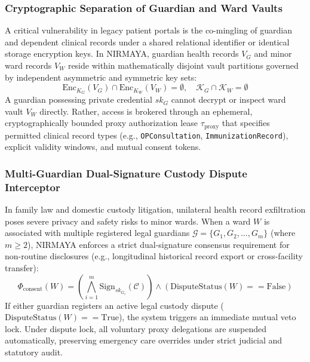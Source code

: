 \documentclass[journal,twocolumn]{IEEEtran}
\begin{document}
\subsubsection{Cryptographic Separation of Guardian and Ward Vaults}
A critical vulnerability in legacy patient portals is the co-mingling of guardian and dependent clinical records under a shared relational identifier or identical storage encryption keys. In NIRMAYA, guardian health records $V_G$ and minor ward records $V_W$ reside within mathematically disjoint vault partitions governed by independent asymmetric and symmetric key sets:
\begin{equation}
    \label{eq:vault_isolation}
    \text{Enc}_{K_G}(V_G) \cap \text{Enc}_{K_W}(V_W) = \emptyset, \quad \mathcal{K}_G \cap \mathcal{K}_W = \emptyset
\end{equation}
A guardian possessing private credential $sk_G$ cannot decrypt or inspect ward vault $V_W$ directly. Rather, access is brokered through an ephemeral, cryptographically bounded proxy authorization lease $\tau_{\text{proxy}}$ that specifies permitted clinical record types (e.g., \texttt{OPConsultation}, \texttt{ImmunizationRecord}), explicit validity windows, and mutual consent tokens.

\subsubsection{Multi-Guardian Dual-Signature Custody Dispute Interceptor}
In family law and domestic custody litigation, unilateral health record exfiltration poses severe privacy and safety risks to minor wards. When a ward $W$ is associated with multiple registered legal guardians $\mathcal{G} = \{G_1, G_2, \dots, G_m\}$ (where $m \ge 2$), NIRMAYA enforces a strict dual-signature consensus requirement for non-routine disclosures (e.g., longitudinal historical record export or cross-facility transfer):
\begin{equation}
    \label{eq:dual_consent}
    \Phi_{\text{consent}}(W) = \left( \bigwedge_{i=1}^{m} \text{Sign}_{sk_{G_i}}(\mathcal{C}) \right) \land (\text{DisputeStatus}(W) == \text{False})
\end{equation}
If either guardian registers an active legal custody dispute ($\text{DisputeStatus}(W) == \text{True}$), the system triggers an immediate mutual veto lock. Under dispute lock, all voluntary proxy delegations are suspended automatically, preserving emergency care overrides under strict judicial and statutory audit.
\end{document}
